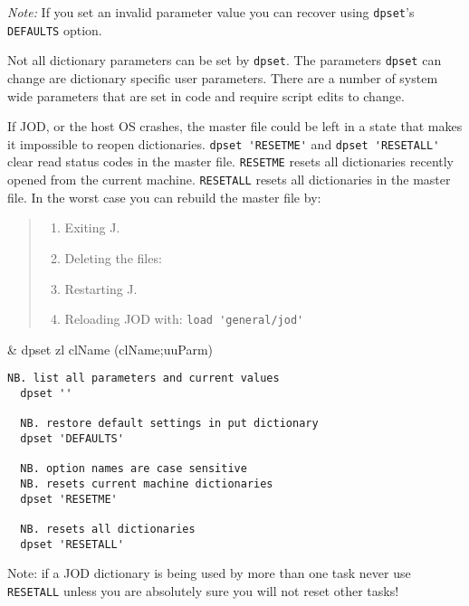 \emph{Note:} If you set an invalid parameter
 value you can recover using \texttt{dpset}'s \texttt{DEFAULTS} option. 

Not all dictionary parameters can be set by \texttt{dpset}. 
The parameters \texttt{dpset} can change are dictionary specific 
user parameters. There are a number of system wide parameters 
that are set in code and require script edits to change. 

If JOD, or the host OS crashes, the master file could be
 left in a state that makes it impossible to reopen dictionaries.
  \verb|dpset 'RESETME'| and \verb|dpset 'RESETALL'| clear read status codes in the master file.
   \texttt{RESETME} resets all dictionaries recently opened from the current machine. 
   \texttt{RESETALL} resets all dictionaries in the master file.  
   In the worst case you can rebuild the master file by:
\begin{quotation}
	\noindent\begin{enumerate}
	  \item Exiting J.
	  \item Deleting the files:
	  \item Restarting J.
	  \item Reloading JOD with: \verb|load 'general/jod'|
	\end{enumerate}  
\end{quotation}

\begin{wordhead}
\monad & dpset zl \argsep clName \argsep (clName;uuParm) \\
\end{wordhead}
\begin{lstlisting}[frame=single,framerule=0pt]
  NB. list all parameters and current values
  dpset ''  
  
  NB. restore default settings in put dictionary          
  dpset 'DEFAULTS'    

  NB. option names are case sensitive 
  NB. resets current machine dictionaries
  dpset 'RESETME'  
  
  NB. resets all dictionaries    
  dpset 'RESETALL'
\end{lstlisting}  

Note: if a JOD dictionary is being used 
by more than one task never use \texttt{RESETALL} unless 
you are absolutely sure you will not reset other tasks! 

